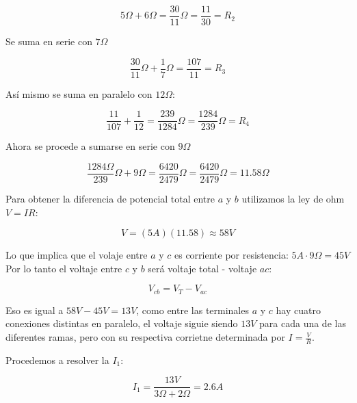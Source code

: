 \begin{enumerate}
	      \begin{equation*}
		      5\Omega+6\Omega=\frac{30}{11}\Omega=\frac{11}{30}=R_2
	      \end{equation*}

	      Se suma en serie con $7\Omega$

	      \begin{equation*}
		      \frac{30}{11}\Omega+\frac{1}{7}\Omega=\frac{107}{11}=R_3
	      \end{equation*}

	      Así mismo se suma en paralelo con $12\Omega$:

	      \begin{equation*}
		      \frac{11}{107}+\frac{1}{12}=\frac{239}{1284}\Omega=\frac{1284}{239}\Omega=R_4
	      \end{equation*}

	      Ahora se procede a sumarse en serie con $9\Omega$

	      \begin{equation*}
		      \frac{1284\Omega}{239}\Omega+9\Omega=\frac{6420}{2479}\Omega=\frac{6420}{2479}\Omega=11.58\Omega
	      \end{equation*}

	      Para obtener la diferencia de potencial total entre $a$ y $b$ utilizamos la ley de ohm $V=IR$:

	      \begin{equation*}
		      V=(5A)(11.58)\approx 58V
	      \end{equation*}

	      Lo que implica que el volaje entre $a$ y $c$ es corriente por resistencia: $5A\cdot 9\Omega=45V$ Por lo tanto el voltaje entre $c$ y $b$ será voltaje total - voltaje $ac$:

	      \begin{equation}
		      V_{cb}=V_T-V_{ac}
	      \end{equation}

	      Eso es igual a $58V-45V=13V$, como entre las terminales $a$ y $c$ hay cuatro conexiones distintas en paralelo, el voltaje siguie siendo $13V$ para cada una de las diferentes ramas, pero con su respectiva corrietne determinada por $I=\frac{V}{R}$.

	      Procedemos a resolver la $I_1$:

	      \begin{equation*}
		      I_1=\frac{13V}{3\Omega+2\Omega}=2.6A
	      \end{equation*}


\end{enumerate}
